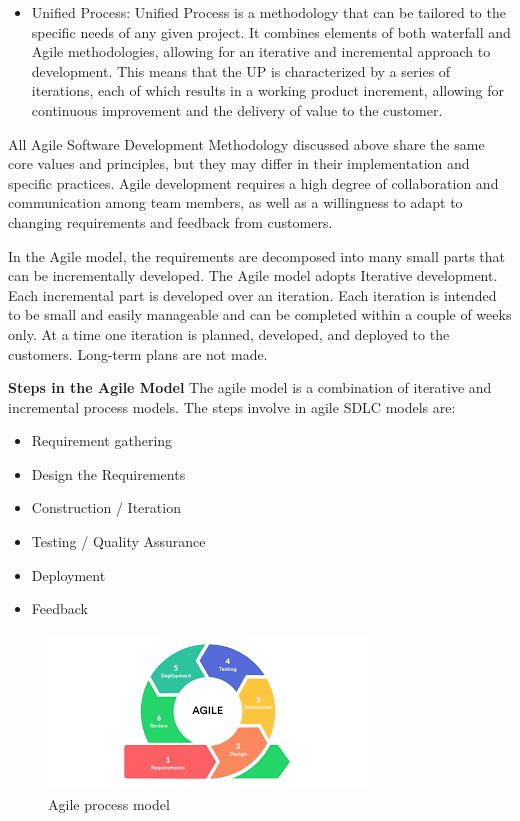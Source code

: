 \begin{itemize}
    \item Unified Process: Unified Process is a methodology that can be tailored to the specific needs of any given project. It combines elements of both waterfall and Agile methodologies, allowing for an iterative and incremental approach to development. This means that the UP is characterized by a series of iterations, each of which results in a working product increment, allowing for continuous improvement and the delivery of value to the customer.
\end{itemize}

All Agile Software Development Methodology discussed above share the same core values and principles, but they may differ in their implementation and specific practices. Agile development requires a high degree of collaboration and communication among team members, as well as a willingness to adapt to changing requirements and feedback from customers.

In the Agile model, the requirements are decomposed into many small parts that can be incrementally developed. The Agile model adopts Iterative development. Each incremental part is developed over an iteration. Each iteration is intended to be small and easily manageable and can be completed within a couple of weeks only. At a time one iteration is planned, developed, and deployed to the customers. Long-term plans are not made. 

\textbf{Steps in the Agile Model}
The agile model is a combination of iterative and incremental process models. The steps involve in agile SDLC models are: 
\begin{itemize}
    \item Requirement gathering
    \item Design the Requirements
    \item Construction / Iteration
    \item Testing / Quality Assurance
    \item Deployment
    \item Feedback
\end{itemize}


\begin{figure}
    \centering
    \includegraphics[width=1\linewidth]{images/agile-process-model.png}
    \caption{Agile process model}
    \label{fig:agile-process-model}
\end{figure}



